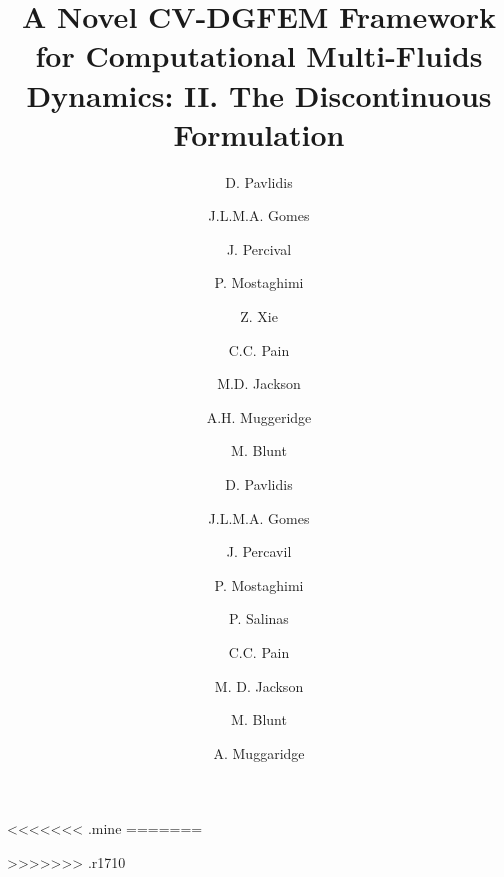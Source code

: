 \documentclass[preprint,authoryear,12pt]{elsarticle}
\begin{document}
\begin{frontmatter}



\title{A Novel CV-DGFEM Framework for Computational Multi-Fluids Dynamics: II. The Discontinuous Formulation }


\author[IC]{D. Pavlidis} \author[UoA]{J.L.M.A. Gomes} \author[IC]{J. Percival} \author[IC]{P. Mostaghimi} \author[IC,ICChemEng]{Z. Xie}\author[IC]{C.C. Pain} \author[IC]{M.D. Jackson} \author[IC]{A.H. Muggeridge} \author[IC]{M. Blunt}

\address[IC]{Applied Modelling and Computation Group, Department of Earth Science and Engineering, Imperial College London, UK}
\address[UoA]{Environmental $\&$ Industrial Fluids Mechanics Group, School of Engineering, University of Aberdeen, UK}
\address[ICChemEng]{Chemical Engineering Department, Imperial College London, UK}

<<<<<<< .mine
=======
\author{D. Pavlidis} 
\author{J.L.M.A. Gomes}
\author{J. Percavil} 
\author{P. Mostaghimi} 
\author{P. Salinas} \author{C.C. Pain} \author{M. D. Jackson} 
\author{M. Blunt} \author{A. Muggaridge} 
>>>>>>> .r1710


\end{frontmatter}
\end{document}
